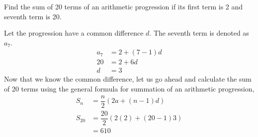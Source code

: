 
%
%
%
%
% 
% 

\question Find the sum of 20 terms of an arithmetic progression if its first term is 2 and seventh term is 20.

\insertQR{}

\ifprintanswers
\fi 

\begin{solution}
  Let the progression have a common difference $d$. The seventh term is denoted as $a_7$.
  \begin{align}
    a_7 &= 2 + (7-1)d \\
    20  &= 2 + 6d \\
    d   &= 3 
  \end{align}
  Now that we know the common difference, let us go ahead and calculate the sum of 20 terms using the general formula for summation of an arithmetic progression,
  \begin{align}
    S_n    &= \dfrac{n}{2}(2a + (n-1)d) \\
    S_{20} &= \dfrac{20}{2}(2(2) + (20-1)3) \\
           &= 610
  \end{align}

\end{solution}

